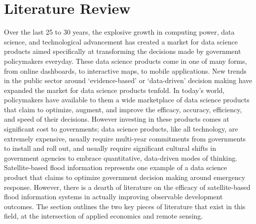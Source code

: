 \chapter{Literature Review}

Over the last 25 to 30 years, the explosive growth in computing power, data science, and technological advancement has created a market for data science products aimed specifically at transforming the decisions made by government policymakers everyday. These data science products come in one of many forms, from online dashboards, to interactive maps, to mobile applications. New trends in the public sector around ‘evidence-based’ or ‘data-driven’ decision making have expanded the market for data science products tenfold. In today’s world, policymakers have available to them a wide marketplace of data science products that claim to optimize, augment, and improve the efficacy, accuracy, efficiency, and speed of their decisions. However investing in these products comes at significant cost to governments; data science products, like all technology, are extremely expensive, usually require multi-year commitments from governments to install and roll out, and usually require significant cultural shifts in government agencies to embrace quantitative, data-driven modes of thinking.\\

Satellite-based flood information represents one example of a data science product that claims to optimize government decision making around emergency response. However, there is a dearth of literature on the efficacy of satellite-based flood information systems in actually improving observable development outcomes. The section outlines the two key pieces of literature that exist in this field, at the intersection of applied economics and remote sensing.\\

